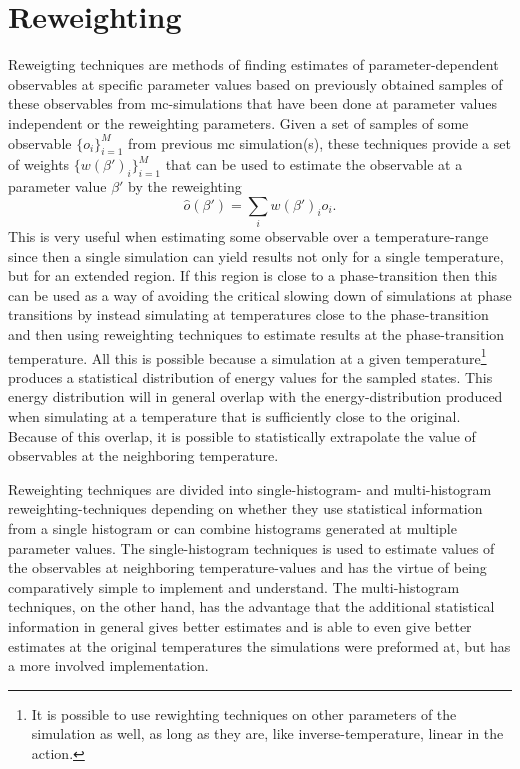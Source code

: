 \section{Reweighting}

Reweigting techniques are methods of finding estimates of parameter-dependent observables at specific parameter values based on previously obtained
samples of these observables from \ac{mc}-simulations that have been done at parameter values independent or the reweighting parameters.
Given a set of samples of some observable $\{o_i\}_{i=1}^M$ from previous \ac{mc} simulation(s), these techniques provide
a set of weights $\{w(\beta')_i\}_{i=1}^M$ that can be used to estimate the observable at a parameter value $\beta'$ by the reweighting
\begin{equation}
    \label{eq:Monte:Reweighting:generalReweighting}
    \hat{o}(\beta') = \sum_iw(\beta')_io_i.
\end{equation}
This is very useful when estimating some observable over a temperature-range since then a single simulation can yield results
not only for a single temperature, but for an extended region. If this region is close to a phase-transition then this can be used as a way of avoiding the
critical slowing down of simulations at phase transitions by instead simulating at temperatures close to the phase-transition and then using reweighting
techniques to estimate results at the phase-transition temperature. All this is possible because a simulation at a given temperature\footnote{It is possible
to use rewighting techniques on other parameters of the simulation as well, as long as they are, like inverse-temperature, linear in the action.}
produces a statistical distribution of energy values for the sampled states. This energy distribution will in general overlap with the energy-distribution
produced when simulating at a temperature that is sufficiently close to the original. Because of this overlap, it is possible to statistically extrapolate
the value of observables at the neighboring temperature.

Reweighting techniques are divided into single-histogram- and multi-histogram reweighting-techniques depending on whether they use statistical information
from a single histogram or can combine histograms generated at multiple parameter values. The single-histogram techniques is used to estimate values of the observables
at neighboring temperature-values and has the virtue of being comparatively simple to implement and understand. The multi-histogram
techniques, on the other hand, has the advantage that the additional statistical information in general gives better estimates and is able to even give better estimates
at the original temperatures the simulations were preformed at, but has a more involved implementation.

